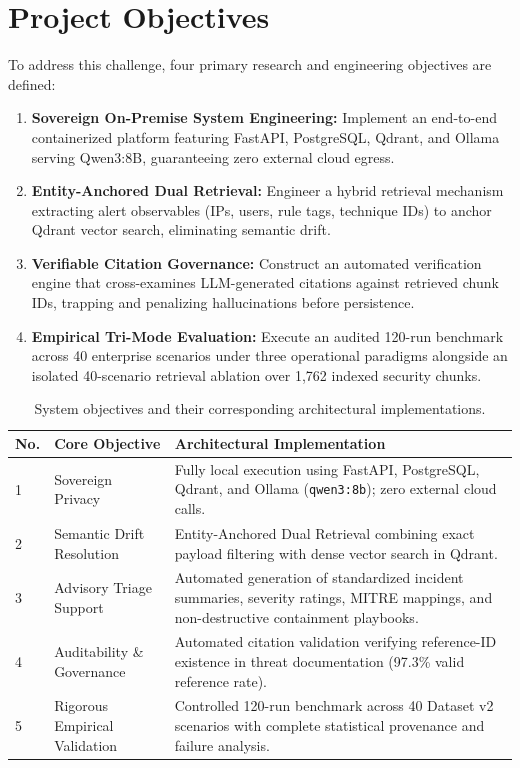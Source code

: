 \section{Project Objectives}
\label{sec:objectives}
To address this challenge, four primary research and engineering objectives are defined:
\begin{enumerate}
  \item \textbf{Sovereign On-Premise System Engineering:} Implement an end-to-end containerized platform featuring FastAPI, PostgreSQL, Qdrant, and Ollama serving Qwen3:8B, guaranteeing zero external cloud egress.
  \item \textbf{Entity-Anchored Dual Retrieval:} Engineer a hybrid retrieval mechanism extracting alert observables (IPs, users, rule tags, technique IDs) to anchor Qdrant vector search, eliminating semantic drift.
  \item \textbf{Verifiable Citation Governance:} Construct an automated verification engine that cross-examines LLM-generated citations against retrieved chunk IDs, trapping and penalizing hallucinations before persistence.
  \item \textbf{Empirical Tri-Mode Evaluation:} Execute an audited 120-run benchmark across 40 enterprise scenarios under three operational paradigms alongside an isolated 40-scenario retrieval ablation over 1,762 indexed security chunks.
\end{enumerate}

\begin{table}[!htbp]
\centering
\caption{System objectives and their corresponding architectural implementations.}
\label{tab:objectives_alignment}
\small
\begin{tabularx}{\textwidth}{@{}l p{4.2cm} X@{}}
\toprule
\textbf{No.} & \textbf{Core Objective} & \textbf{Architectural Implementation} \\
\midrule
1 & Sovereign Privacy & Fully local execution using FastAPI, PostgreSQL, Qdrant, and Ollama (\texttt{qwen3:8b}); zero external cloud calls. \\
2 & Semantic Drift Resolution & Entity-Anchored Dual Retrieval combining exact payload filtering with dense vector search in Qdrant. \\
3 & Advisory Triage Support & Automated generation of standardized incident summaries, severity ratings, MITRE mappings, and non-destructive containment playbooks. \\
4 & Auditability \& Governance & Automated citation validation verifying reference-ID existence in threat documentation (97.3\% valid reference rate). \\
5 & Rigorous Empirical Validation & Controlled 120-run benchmark across 40 Dataset v2 scenarios with complete statistical provenance and failure analysis. \\
\bottomrule
\end{tabularx}
\end{table}

